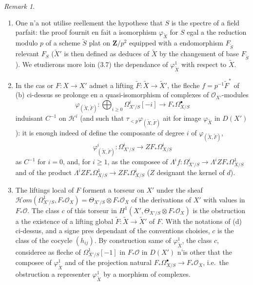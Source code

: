 \documentclass[12pt,a4paper]{article}
\theoremstyle{plain}
\theoremstyle{definition}
\theoremstyle{remark}
\newtheorem{remark}[theorem]{Remark}
\newcommand{\cO}{\mathcal{O}}
\begin{document}
\begin{remark}\label{rem:2.2}
\begin{enumerate}[label=(\roman*)]
\item One n'a not utilise reellement the hypothese that $S$ is the spectre of a field parfait: the proof fournit en fait a isomorphism $\varphi_{\tilde{X}}$ for $S$ egal a the reduction modulo $p$ of a scheme $\tilde{S}$ plat on $\mathbf{Z}/p^2$ equipped with a endomorphism $F_{\tilde{S}}$ relevant $F_S$ ($\tilde{X}'$ is then defined as deduces of $\tilde{X}$ by the changement of base $F_{\tilde{S}}$). We etudierons more loin (3.7) the dependance of $\varphi^1_{\tilde{X}}$ with respect to $\tilde{X}$.

\item In the cas or $F: X \to X'$ admet a lifting $\tilde{F}: \tilde{X} \to \tilde{X}'$, the fleche $f = p^{-1}\tilde{F}^*$ of (b) ci-dessus se prolonge en a quasi-isomorphism of complexes of $\cO_{X'}$-modules
\[
\varphi_{(\tilde{X}, \tilde{F})}: \bigoplus_{i \ge 0} \Omega^i_{X'/S}[-i] \to F_* \Omega^{\bullet}_{X/S}
\]
induisant $C^{-1}$ on $\mathscr{H}^i$ (and such that $\tau_{<p} \varphi_{(\tilde{X}, \tilde{F})}$ ait for image $\varphi_{\tilde{X}}$ in $D(X')$): it is enough indeed of define the composante of degree $i$ of $\varphi_{(\tilde{X}, \tilde{F})}$,
\[
\varphi^i_{(\tilde{X}, \tilde{F})}: \Omega^i_{X'/S} \to Z F_* \Omega^i_{X/S}
\]
as $C^{-1}$ for $i = 0$, and, for $i \ge 1$, as the composee of $\Lambda^i f: \Omega^i_{X'/S} \to \Lambda^i Z F_* \Omega^1_{X/S}$ and of the product $\Lambda^i Z F_* \Omega^1_{X/S} \to Z F_* \Omega^i_{X/S}$ ($Z$ designant the kernel of $d$).

\item The liftings local of $F$ forment a torseur on $X'$ under the sheaf $\mathscr{H}om(\Omega^1_{X'/S}, F_* \cO_X) = \Theta_{X'/S} \otimes F_* \cO_X$ of the derivations of $X'$ with values in $F_* \cO$. The class $c$ of this torseur in $H^1(X', \Theta_{X'/S} \otimes F_* \cO_X)$ is the obstruction a the existence of a lifting global $\tilde{F}: \tilde{X} \to \tilde{X}'$ of $F$. With the notations of (d) ci-dessus, and a signe pres dependant of the conventions choisies, $c$ is the class of the cocycle $(h_{ij})$. By construction same of $\varphi^1_{\tilde{X}}$, the class $c$, consideree as fleche of $\Omega^1_{X'/S}[-1]$ in $F_* \cO$ in $D(X')$ n'is other that the composee of $\varphi^1_{\tilde{X}}$ and of the projection natural $F_* \Omega^{\bullet}_{X/S} \to F_* \cO_X$, i.e.~the obstruction a representer $\varphi^1_{\tilde{X}}$ by a morphism of complexes.


\end{enumerate}
\end{remark}
\end{document}
